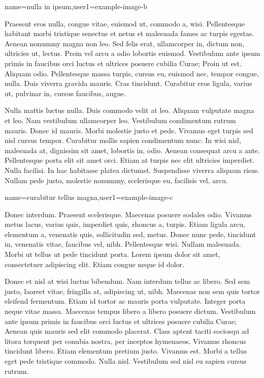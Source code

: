 %
{name={nulla in ipsum},user1={example-image-b}}%
{%
 Praesent eros nulla, congue vitae, euismod ut, commodo a, wisi.
Pellentesque habitant morbi tristique senectus et netus et malesuada
fames ac turpis egestas.  Aenean nonummy magna non leo. Sed felis
erat, ullamcorper in, dictum non, ultricies ut, lectus. Proin vel
arcu a odio lobortis euismod.  Vestibulum ante ipsum primis in
faucibus orci luctus et ultrices posuere cubilia Curae; Proin ut
est. Aliquam odio. Pellentesque massa turpis, cursus eu, euismod
nec, tempor congue, nulla. Duis viverra gravida mauris. Cras
tincidunt. Curabitur eros ligula, varius ut, pulvinar in, cursus
faucibus, augue.

Nulla mattis luctus nulla. Duis commodo velit at leo.  Aliquam
vulputate magna et leo. Nam vestibulum ullamcorper leo.  Vestibulum
condimentum rutrum mauris. Donec id mauris. Morbi molestie justo et
pede. Vivamus eget turpis sed nisl cursus tempor.  Curabitur mollis
sapien condimentum nunc. In wisi nisl, malesuada at, dignissim sit
amet, lobortis in, odio. Aenean consequat arcu a ante. Pellentesque
porta elit sit amet orci. Etiam at turpis nec elit ultricies
imperdiet. Nulla facilisi. In hac habitasse platea dictumst.
Suspendisse viverra aliquam risus. Nullam pede justo, molestie
nonummy, scelerisque eu, facilisis vel, arcu.
}

%
{name={curabitur tellus magna},user1={example-image-c}}%
{%
Donec interdum. Praesent scelerisque.  Maecenas posuere sodales
odio. Vivamus metus lacus, varius quis, imperdiet quis, rhoncus a,
turpis. Etiam ligula arcu, elementum a, venenatis quis, sollicitudin
sed, metus. Donec nunc pede, tincidunt in, venenatis vitae, faucibus
vel, nibh. Pellentesque wisi. Nullam malesuada. Morbi ut tellus ut
pede tincidunt porta. Lorem ipsum dolor sit amet, consectetuer
adipiscing elit. Etiam congue neque id dolor.

Donec et nisl at wisi luctus bibendum. Nam interdum tellus ac
libero. Sed sem justo, laoreet vitae, fringilla at, adipiscing ut,
nibh. Maecenas non sem quis tortor eleifend fermentum. Etiam id
tortor ac mauris porta vulputate. Integer porta neque vitae massa.
Maecenas tempus libero a libero posuere dictum.  Vestibulum ante
ipsum primis in faucibus orci luctus et ultrices posuere cubilia
Curae; Aenean quis mauris sed elit commodo placerat.  Class aptent
taciti sociosqu ad litora torquent per conubia nostra, per inceptos
hymenaeos. Vivamus rhoncus tincidunt libero. Etiam elementum pretium
justo. Vivamus est. Morbi a tellus eget pede tristique commodo.
Nulla nisl. Vestibulum sed nisl eu sapien cursus rutrum.
}

